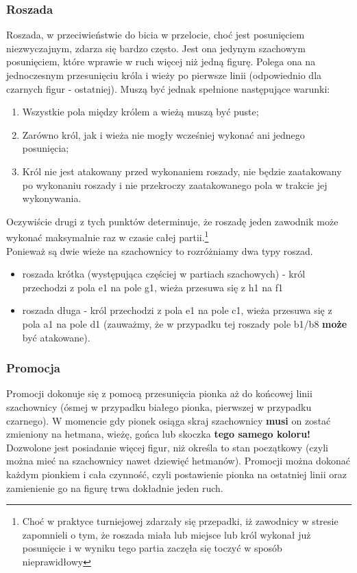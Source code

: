 \documentclass[12pt,leqno]{article}
\begin{document}
\subsubsection{Roszada}
Roszada, w przeciwieństwie do bicia w przelocie, choć jest posunięciem niezwyczajnym, zdarza się bardzo często. Jest ona jedynym szachowym posunięciem, które wprawie w ruch więcej niż jedną figurę. Polega ona na jednoczesnym przesunięciu króla i wieży po pierwsze linii (odpowiednio dla czarnych figur - ostatniej). Muszą być jednak spełnione następujące warunki:
\begin{enumerate}
\item Wszystkie pola między królem a wieżą muszą być puste;
\item Zarówno król, jak i wieża nie mogły wcześniej wykonać ani jednego posunięcia;
\item Król nie jest atakowany przed wykonaniem roszady, nie będzie zaatakowany po wykonaniu roszady i nie przekroczy zaatakowanego pola w trakcie jej wykonywania.
\end{enumerate}
Oczywiście drugi z tych punktów determinuje, że roszadę jeden zawodnik może wykonać maksymalnie raz w czasie całej partii.\footnote{Choć w praktyce turniejowej zdarzały się przepadki, iż zawodnicy w stresie zapomnieli o tym, że roszada miała lub miejsce lub król wykonał już posunięcie i w wyniku tego partia zaczęła się toczyć w sposób nieprawidłowy}\\
Ponieważ są dwie wieże na szachownicy to rozróżniamy dwa typy roszad.
\begin{itemize}
\item roszada krótka (występująca częściej w partiach szachowych) - król przechodzi z pola e1 na pole g1, wieża przesuwa się z h1 na f1
\item roszada długa - król przechodzi z pola e1 na pole c1, wieża przesuwa się z pola a1 na pole d1 (zauważmy, że w przypadku tej roszady pole b1/b8 {\bf może} być atakowane).
\end{itemize}
\subsubsection{Promocja}
Promocji dokonuje się z pomocą przesunięcia pionka aż do końcowej linii szachownicy (ósmej w przypadku białego pionka, pierwszej w przypadku czarnego). W momencie gdy pionek osiąga skraj szachownicy {\bf musi} on zostać zmieniony na hetmana, wieżę, gońca lub skoczka {\bf tego samego koloru!} Dozwolone jest posiadanie więcej figur, niż określa to stan początkowy (czyli można mieć na szachownicy nawet dziewięć hetmanów). Promocji można dokonać każdym pionkiem i cała czynność, czyli postawienie pionka na ostatniej linii oraz zamienienie go na figurę trwa dokładnie jeden ruch.
\end{document}
